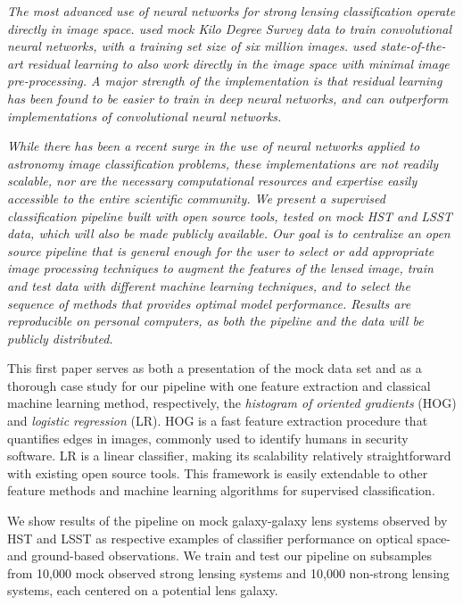 \documentclass{emulateapj}
\newcommand{\wording}[1]{{\it\color{purple} #1}}
\begin{document}
\wording{The most advanced use of neural networks for strong lensing
  classification operate directly in image space.
  \citep{petrillo_etal17} used mock Kilo Degree Survey data to train
  convolutional neural networks, with a training set size of six
  million images. \citet{lanusse_etal17} used state-of-the-art
  residual learning to also work directly in the image space with
  minimal image pre-processing.  A major strength of the
  \citet{lanusse_etal17} implementation is that residual learning has
  been found to be easier to train in deep neural networks, and can
  outperform implementations of convolutional neural networks.}

\wording{While there has been a recent surge in the use of neural
  networks applied to astronomy image classification problems, these
  implementations are not readily scalable, nor are the necessary
  computational resources and expertise easily accessible to the
  entire scientific community.  We present a supervised classification
  pipeline built with open source tools, tested on mock HST and LSST
  data, which will also be made publicly available.  Our goal is to
  centralize an open source pipeline that is general enough for the
  user to select or add appropriate image processing techniques to
  augment the features of the lensed image, train and test data with
  different machine learning techniques, and to select the sequence of
  methods that provides optimal model performance.  Results are
  reproducible on personal computers, as both the pipeline and the
  data will be publicly distributed.}

This first paper serves as both a presentation of the mock data set
and as a thorough case study for our pipeline with one feature
extraction and classical machine learning method, respectively, the
{\em histogram of oriented gradients} (HOG) and {\em logistic
  regression} (LR).  HOG is a fast feature extraction procedure that
quantifies edges in images, commonly used to identify humans in
security software.  LR is a linear classifier, making its scalability
relatively straightforward with existing open source tools.  This
framework is easily extendable to other feature methods and machine
learning algorithms for supervised classification.

We show results of the pipeline on mock galaxy-galaxy lens systems
observed by HST and LSST as respective examples of classifier
performance on optical space- and ground-based observations.  We train
and test our pipeline on subsamples from 10,000 mock observed strong
lensing systems and 10,000 non-strong lensing systems, each centered
on a potential lens galaxy.
\end{document}
